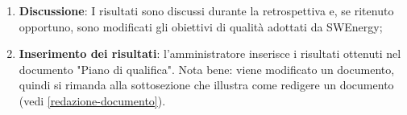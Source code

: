 \begin{itemize}
\begin{enumerate}
		      \item \textbf{Discussione}: I risultati sono discussi durante la
		            retrospettiva e, se ritenuto opportuno, sono modificati
		            gli obiettivi di qualità adottati da SWEnergy;

		      \item \textbf{Inserimento dei risultati}: l'amministratore
		            inserisce i risultati ottenuti nel documento "Piano di
		            qualifica".
		            Nota bene: viene modificato un documento, quindi si rimanda
		            alla sottosezione che illustra come redigere un documento
		            (vedi \cref{redazione-documento}).
	      \end{enumerate}
\end{itemize}
